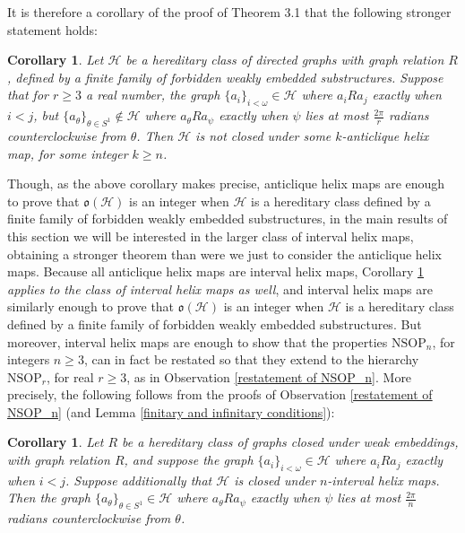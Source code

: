 \documentclass{amsart}
\newtheorem{cor}[theorem]{Corollary}
\theoremstyle{definition}
\theoremstyle{remark}
\numberwithin{equation}{section}
\begin{document}
It is therefore a corollary of the proof of Theorem 3.1 that the following stronger statement holds:

\begin{cor}\label{anticlique helix integrality}
 Let $\mathcal{H}$ be a hereditary class of directed graphs with graph relation $R$, defined by a finite family of forbidden weakly embedded substructures. Suppose that for $r \geq 3$ a real number, the graph $\{a_{i}\}_{i < \omega} \in \mathcal{H}$ where $a_{i} R a_{j}$ exactly when $i < j$, but $\{a_{\theta}\}_{\theta \in S^{1}} \notin \mathcal{H}$ where $a_{\theta} R a_{\psi}$ exactly when $\psi$ lies at most $\frac{2\pi}{r}$ radians counterclockwise from $\theta$. Then $\mathcal{H}$ is not closed under some $k$-anticlique helix map, for some integer $k \geq n$.
\end{cor}


    Though, as the above corollary makes precise, anticlique helix maps are enough to prove that $\mathfrak{o}(\mathcal{H})$ is an integer when $\mathcal{H}$ is a hereditary class defined by a finite family of forbidden weakly embedded substructures, in the main results of this section we will be interested in the larger class of interval helix maps, obtaining a stronger theorem than were we just to consider the anticlique helix maps. Because all anticlique helix maps are interval helix maps, Corollary \ref{anticlique helix integrality} \textit{applies to the class of interval helix maps as well}, and interval helix maps are similarly enough to prove that $\mathfrak{o}(\mathcal{H})$ is an integer when $\mathcal{H}$ is a hereditary class defined by a finite family of forbidden weakly embedded substructures. But moreover, interval helix maps are enough to show that the properties $\mathrm{NSOP}_{n}$, for integers $n \geq 3$, can in fact be restated so that they extend to the hierarchy $\mathrm{NSOP}_{r}$, for real $r \geq 3$, as in Observation \ref{restatement of NSOP_n}. More precisely, the following follows from the proofs of Observation \ref{restatement of NSOP_n} (and Lemma \ref{finitary and infinitary conditions}):

    \begin{cor}\label{interval helix restatement of NSOP_n}
        Let $R$ be a hereditary class of graphs closed under weak embeddings, with graph relation $R$, and suppose  the graph $\{a_{i}\}_{i < \omega} \in \mathcal{H}$ where $a_{i} R a_{j}$ exactly when $i < j$. Suppose additionally that $\mathcal{H}$ is closed under $n$-interval helix maps. Then the graph $\{a_{\theta}\}_{\theta \in S^{1}} \in \mathcal{H}$ where $a_{\theta} R a_{\psi}$ exactly when $\psi$ lies at most $\frac{2\pi}{n}$ radians counterclockwise from $\theta$. 
    \end{cor}
\end{document}

